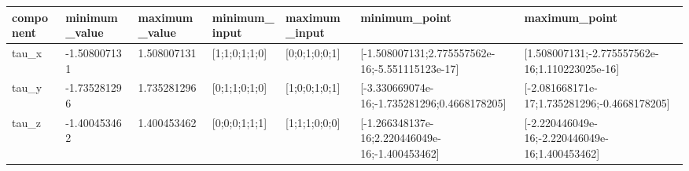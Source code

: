 \begin{tabular}{@{}lllllll@{}}
\toprule
component & minimum\_value & maximum\_value & minimum\_input & maximum\_input & minimum\_point & maximum\_point \\
\midrule
tau\_x & -1.508007131 & 1.508007131 & [1;1;0;1;1;0] & [0;0;1;0;0;1] & [-1.508007131;2.775557562e-16;-5.551115123e-17] & [1.508007131;-2.775557562e-16;1.110223025e-16] \\
tau\_y & -1.735281296 & 1.735281296 & [0;1;1;0;1;0] & [1;0;0;1;0;1] & [-3.330669074e-16;-1.735281296;0.4668178205] & [-2.081668171e-17;1.735281296;-0.4668178205] \\
tau\_z & -1.400453462 & 1.400453462 & [0;0;0;1;1;1] & [1;1;1;0;0;0] & [-1.266348137e-16;2.220446049e-16;-1.400453462] & [-2.220446049e-16;-2.220446049e-16;1.400453462] \\
\bottomrule
\end{tabular}

